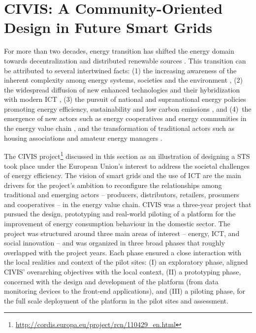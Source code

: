 \section{CIVIS: A Community-Oriented Design in Future Smart Grids}
\label{sec:civis}

For more than two decades, energy transition has shifted the energy domain
towards decentralization and distributed renewable sources \cite{rifkin_third_2011,sovacool_how_2016}. This transition can be attributed to several intertwined facts: 
(1) the increasing awareness of the inherent complexity among energy systems, societies 
and the environment \cite{bulkeley_bringing_2012,umbach_global_2010}, (2) the
widespread diffusion of new enhanced technologies and their hybridization with modern ICT
\cite{putrus_smart_2013,schick_innovating_2013}, (3) the pursuit of national and 
supranational energy policies promoting energy efficiency, sustainability and low carbon emissions 
\cite{da_graca_carvalho_eu_2012}, and (4)~the emergence of new actors such as energy cooperatives and energy communities in the energy value chain \cite{viardot_role_2013}, and the 
transformation of traditional actors such as housing associations and amateur energy managers 
\cite{hasselqvist_linking_2016}.

The CIVIS project\footnote{\url{http://cordis.europa.eu/project/rcn/110429\_en.html}} discussed in this section as an illustration of designing a STS took place under the European Union's interest to address the societal challenges of energy efficiency. The vision of smart grids and the use of ICT are 
the main drivers for the project's ambition to reconfigure the relationships among traditional and 
emerging actors -- producers, distributors, retailers, 
prosumers and cooperatives -- in the energy value chain. CIVIS was a three-year project that pursued the design, prototyping and real-world piloting of 
a platform for the improvement of energy consumption behaviour in the domestic sector. The project was 
structured around three main areas of interest -- energy, ICT, and social innovation 
-- and was organized in three broad phases that roughly overlapped with the project years.
Each phase ensured a close interaction with the local realities and context of the pilot sites: (I) an 
exploratory phase, aligned CIVIS' overarching objectives with the local context,
(II) a prototyping phase, concerned with the design and development of the platform 
(from data monitoring devices to the front-end applications), and (III) a piloting 
phase, for the full scale deployment of the platform in the pilot sites and 
assessment.


